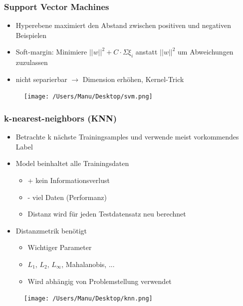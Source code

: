 \documentclass[paper=a4, fontsize=11pt]{scrartcl} %
\numberwithin{equation}{section} %
\numberwithin{figure}{section} %
\numberwithin{table}{section} %
\begin{document}
\subsubsection{Support Vector Machines}

\begin{minipage}{0.55\textwidth}
\begin{itemize}
\item Hyperebene maximiert den Abstand zwischen positiven und negativen Beispielen
\item Soft-margin: Minimiere $||w||^2 + C \cdot \Sigma \xi_i$ anstatt $||w||^2$ um Abweichungen zuzulassen
\item nicht separierbar $\rightarrow$ Dimension erhöhen, Kernel-Trick
\end{itemize}
\end{minipage} \hfill
\begin{minipage}{0.35\textwidth}
\begin{figure}[H]
\texttt{[image: /Users/Manu/Desktop/svm.png]}
\end{figure}
\end{minipage}

\subsubsection{k-nearest-neighbors (KNN)}

\begin{minipage}{0.55\textwidth}
\begin{itemize}
\item Betrachte k nächste Trainingsamples und verwende meist vorkommendes Label
\item Model beinhaltet alle Trainingsdaten
\begin{itemize}
\item + kein Informationsverlust
\item - viel Daten (Performanz)
\item Distanz wird für jeden Testdatensatz neu berechnet
\end{itemize}
\item Distanzmetrik benötigt
\begin{itemize}
\item Wichtiger Parameter
\item $L_1$, $L_2$, $L_\infty$, Mahalanobis, ...
\item Wird abhängig von Problemstellung verwendet
\end{itemize}
\end{itemize}
\end{minipage} \hfill
\begin{minipage}{0.4\textwidth}
\begin{figure}[H]
\texttt{[image: /Users/Manu/Desktop/knn.png]}
\end{figure}
\end{minipage}
\end{document}
